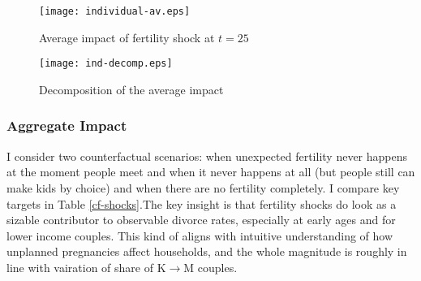 \documentclass[12pt,letter]{article}
\begin{document}

\begin{figure}[h!]
\centering
\texttt{[image: individual-av.eps]}
\vspace{-3em}
\caption{Average impact of fertility shock at $t=25$\label{individual-av}}
\end{figure}

\begin{figure}[h!]
\centering
\texttt{[image: ind-decomp.eps]}
\vspace{-0.5em}
\caption{Decomposition of the average impact\label{ind-decomp}}
\end{figure}



\subsubsection{Aggregate Impact}
I consider two counterfactual scenarios: when unexpected fertility never happens at the moment people meet and when it never happens at all (but people still can make kids by choice) and when there are no fertility completely. I compare key targets in Table \ref{cf-shocks}.The key insight is that fertility shocks do look as a sizable contributor to observable divorce rates, especially at early ages and for lower income couples. This kind of aligns with intuitive understanding of how unplanned pregnancies affect households, and the whole magnitude is roughly in line with vairation of share of K$\to$M couples. 
\end{document}
